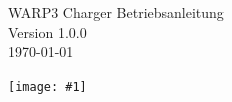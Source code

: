 \documentclass[a4paper,10pt]{article}
\title{}
\author{}
\newcommand{\gfx}[1]{\texttt{[image: \#1]}}
\begin{document}
\pagestyle{empty}
\begin{titlepage}
    \vspace*{-3.08cm}
    \vfill
    \begin{center}
		\color{white}
        \Huge
        WARP3 Charger Betriebsanleitung\\\vspace{1cm}
        \large
        Version 1.0.0\\\vspace{0.25cm}
        \today
    \end{center}
    \vfill \gfx{./img_warp3/resized/front.png}
	\pagecolor{covergray}
\end{titlepage}
\newpage
\pagecolor{white}
\null
\newpage
\pagestyle{fancy}
\end{document}
